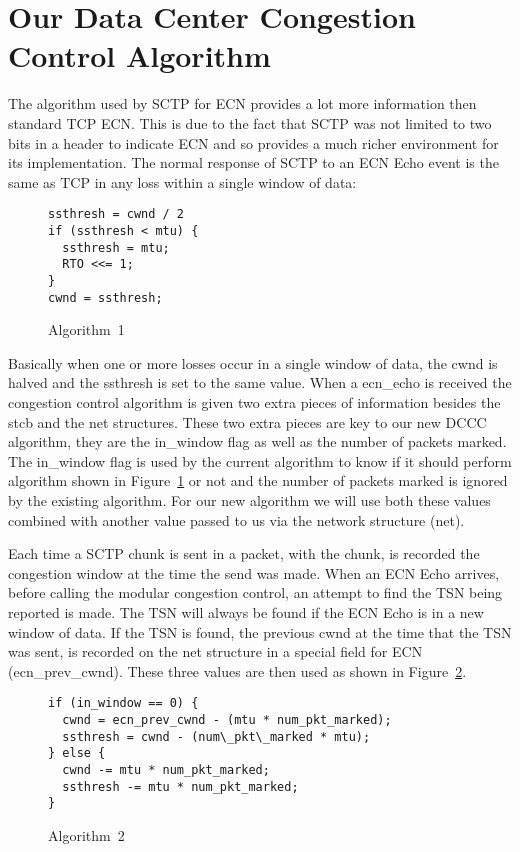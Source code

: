 \documentclass[12pt]{article}
\begin{document}
\section{Our Data Center Congestion Control Algorithm}
\label{algo}
The algorithm used by SCTP for ECN provides a lot more information then
standard TCP ECN. This is due to the fact that SCTP was not limited to two bits
in a header to indicate ECN and so provides a much richer environment for its
implementation. The normal response of SCTP to an ECN Echo event is the same
as TCP in any loss within a single window of data:
\begin{figure}[h!]
\begin{verbatim}
ssthresh = cwnd / 2
if (ssthresh < mtu) {
  ssthresh = mtu;
  RTO <<= 1;
}
cwnd = ssthresh;
\end{verbatim}
\caption{Algorithm~1}
\label{algo1}
\end{figure}
Basically when one or more losses occur in a single window of data, the cwnd is halved and
the ssthresh is set to the same value. When a ecn\_echo is received the congestion
control algorithm is given two extra pieces of information besides the stcb and the 
net structures.
These two extra pieces are key to our new DCCC algorithm, they are
the in\_window flag as well as the number of packets marked. The in\_window flag
is used by the current algorithm to know if it should perform algorithm shown in Figure~\ref{algo1} or not and
the number of packets marked is ignored by the existing algorithm. For
our new algorithm we will use both these values combined with another value passed
to us via the network structure (net).

Each time a SCTP chunk is sent in a packet, with the chunk, is recorded the congestion
window at the time the send was made. When an ECN Echo arrives, before calling
the modular congestion control, an attempt to find the TSN being reported is made. The TSN
will always be found if the ECN Echo is in a new window of data. If the TSN
is found, the previous cwnd at the time that the TSN was sent, is recorded on
the net structure in a special field for ECN (ecn\_prev\_cwnd).  These three values are then used as shown in Figure~\ref{algo2}.

\begin{figure}[h!]
\begin{verbatim}
if (in_window == 0) {
  cwnd = ecn_prev_cwnd - (mtu * num_pkt_marked);
  ssthresh = cwnd - (num\_pkt\_marked * mtu);
} else {
  cwnd -= mtu * num_pkt_marked;
  ssthresh -= mtu * num_pkt_marked;
}
\end{verbatim}
\caption{Algorithm~2}
\label{algo2}
\end{figure}
\end{document}
